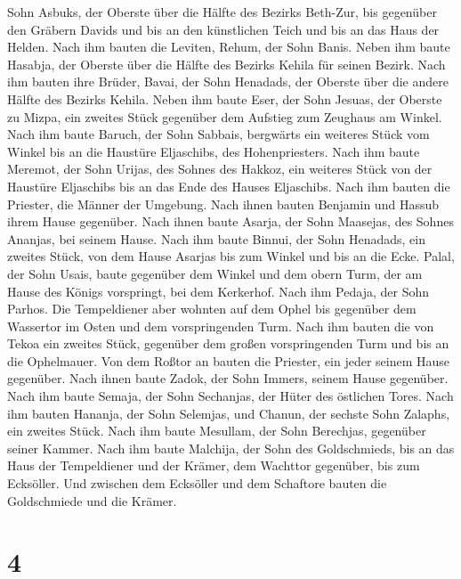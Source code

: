 Sohn Asbuks, der Oberste über die Hälfte des Bezirks Beth-Zur, bis
gegenüber den Gräbern Davids und bis an den künstlichen Teich und bis an
das Haus der Helden.  Nach ihm bauten die Leviten, Rehum,
der Sohn Banis. Neben ihm baute Hasabja, der Oberste über die Hälfte des
Bezirks Kehila für seinen Bezirk.  Nach ihm bauten ihre
Brüder, Bavai, der Sohn Henadads, der Oberste über die andere Hälfte des
Bezirks Kehila.  Neben ihm baute Eser, der Sohn Jesuas,
der Oberste zu Mizpa, ein zweites Stück gegenüber dem Aufstieg zum
Zeughaus am Winkel.  Nach ihm baute Baruch, der Sohn
Sabbais, bergwärts ein weiteres Stück vom Winkel bis an die Haustüre
Eljaschibs, des Hohenpriesters.  Nach ihm baute Meremot,
der Sohn Urijas, des Sohnes des Hakkoz, ein weiteres Stück von der
Haustüre Eljaschibs bis an das Ende des Hauses Eljaschibs.
 Nach ihm bauten die Priester, die Männer der Umgebung.
 Nach ihnen bauten Benjamin und Hassub ihrem Hause
gegenüber. Nach ihnen baute Asarja, der Sohn Maasejas, des Sohnes
Ananjas, bei seinem Hause.  Nach ihm baute Binnui, der
Sohn Henadads, ein zweites Stück, von dem Hause Asarjas bis zum Winkel
und bis an die Ecke.  Palal, der Sohn Usais, baute
gegenüber dem Winkel und dem obern Turm, der am Hause des Königs
vorspringt, bei dem Kerkerhof. Nach ihm Pedaja, der Sohn Parhos.
 Die Tempeldiener aber wohnten auf dem Ophel bis
gegenüber dem Wassertor im Osten und dem vorspringenden Turm.
 Nach ihm bauten die von Tekoa ein zweites Stück,
gegenüber dem großen vorspringenden Turm und bis an die Ophelmauer.
 Von dem Roßtor an bauten die Priester, ein jeder seinem
Hause gegenüber.  Nach ihnen baute Zadok, der Sohn
Immers, seinem Hause gegenüber. Nach ihm baute Semaja, der Sohn
Sechanjas, der Hüter des östlichen Tores.  Nach ihm
bauten Hananja, der Sohn Selemjas, und Chanun, der sechste Sohn Zalaphs,
ein zweites Stück. Nach ihm baute Mesullam, der Sohn Berechjas,
gegenüber seiner Kammer.  Nach ihm baute Malchija, der
Sohn des Goldschmieds, bis an das Haus der Tempeldiener und der Krämer,
dem Wachttor gegenüber, bis zum Ecksöller.  Und zwischen
dem Ecksöller und dem Schaftore bauten die Goldschmiede und die Krämer.

\hypertarget{section-3}{%
\section{4}\label{section-3}}

